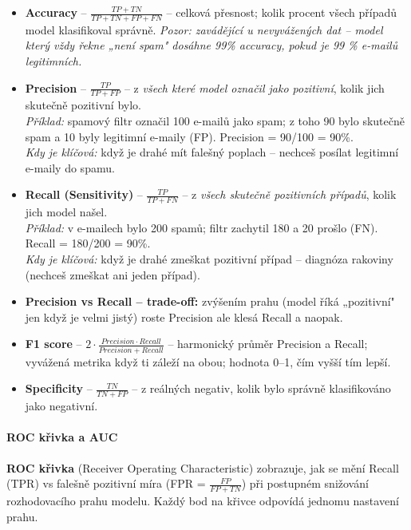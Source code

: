 \begin{itemize}
  \item \textbf{Accuracy} -- $\frac{TP+TN}{TP+TN+FP+FN}$ -- celková přesnost; kolik procent všech případů model klasifikoval správně. \textit{Pozor: zavádějící u nevyvážených dat -- model který vždy řekne „není spam" dosáhne 99\% accuracy, pokud je 99 \% e-mailů legitimních.}

  \item \textbf{Precision} -- $\frac{TP}{TP+FP}$ -- z \textit{všech které model označil jako pozitivní}, kolik jich skutečně pozitivní bylo. \\
    \textit{Příklad:} spamový filtr označil 100 e-mailů jako spam; z toho 90 bylo skutečně spam a 10 byly legitimní e-maily (FP). Precision = 90/100 = 90\%. \\
    \textit{Kdy je klíčová:} když je drahé mít falešný poplach -- nechceš posílat legitimní e-maily do spamu.

  \item \textbf{Recall (Sensitivity)} -- $\frac{TP}{TP+FN}$ -- z \textit{všech skutečně pozitivních případů}, kolik jich model našel. \\
    \textit{Příklad:} v e-mailech bylo 200 spamů; filtr zachytil 180 a 20 prošlo (FN). Recall = 180/200 = 90\%. \\
    \textit{Kdy je klíčová:} když je drahé zmeškat pozitivní případ -- diagnóza rakoviny (nechceš zmeškat ani jeden případ).

  \item \textbf{Precision vs Recall -- trade-off:} zvýšením prahu (model říká „pozitivní" jen když je velmi jistý) roste Precision ale klesá Recall a naopak.

  \item \textbf{F1 score} -- $2 \cdot \frac{Precision \cdot Recall}{Precision + Recall}$ -- harmonický průměr Precision a Recall; vyvážená metrika když ti záleží na obou; hodnota 0--1, čím vyšší tím lepší.

  \item \textbf{Specificity} -- $\frac{TN}{TN+FP}$ -- z reálných negativ, kolik bylo správně klasifikováno jako negativní.
\end{itemize}

\paragraph{ROC křivka a AUC}
\textbf{ROC křivka} (Receiver Operating Characteristic) zobrazuje, jak se mění Recall (TPR) vs falešně pozitivní míra (FPR = $\frac{FP}{FP+TN}$) při postupném snižování rozhodovacího prahu modelu. Každý bod na křivce odpovídá jednomu nastavení prahu.

